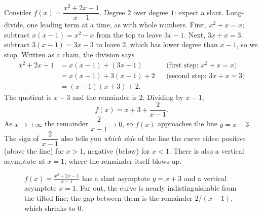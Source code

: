 \begin{example}
\label{ch09:ex-slant}
Consider $f(x)=\dfrac{x^2+2x-1}{x-1}$. Degree $2$ over degree $1$: expect a
slant. Long-divide, one leading term at a time, as with whole numbers. First,
$x^2 \div x = x$; subtract $x(x-1)=x^2-x$ from the top to leave $3x-1$. Next,
$3x\div x = 3$; subtract $3(x-1)=3x-3$ to leave $2$, which has lower degree
than $x-1$, so we stop. Written as a chain, the division says
\begin{align*}
x^2+2x-1 &= x(x-1) + (3x-1) && \text{(first step: } x^2\div x = x\text{)}\\
         &= x(x-1) + 3(x-1) + 2 && \text{(second step: } 3x\div x = 3\text{)}\\
         &= (x-1)(x+3) + 2 .
\end{align*}
The quotient is $x+3$ and the remainder is $2$. Dividing by $x-1$,
\[
   f(x) = x+3 + \frac{2}{x-1}.
\]
As $x\to\pm\infty$ the remainder $\dfrac{2}{x-1}\to 0$, so $f(x)$ approaches the
line $y=x+3$. The sign of $\dfrac{2}{x-1}$ also tells you \emph{which side} of
the line the curve rides: positive (above the line) for $x>1$, negative (below)
for $x<1$. There is also a vertical asymptote at $x=1$, where the remainder
itself blows up.
\end{example}

\begin{figure}[htbp]
\centering
{}
\caption{$f(x)=\frac{x^2+2x-1}{x-1}$ has a slant asymptote $y=x+3$ and a vertical
asymptote $x=1$. Far out, the curve is nearly indistinguishable from the tilted
line; the gap between them is the remainder $2/(x-1)$, which shrinks to $0$.}
\label{ch09:fig-slant}
\end{figure}

